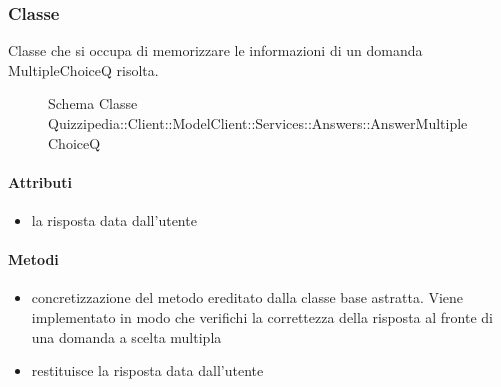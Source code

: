 \subsubsection{Classe }
Classe che si occupa di memorizzare le informazioni di un domanda MultipleChoiceQ risolta.
\begin{figure}[H]
\centering
\noindent{}
\caption[Schema Classe AnswerMultipleChoiceQ]{Schema Classe Quizzipedia::Client::ModelClient::Services::Answers::AnswerMultipleChoiceQ}
\end{figure}
\paragraph{Attributi}
\begin{itemize}
\item {}
\newline
la risposta data dall'utente
\end{itemize}
\paragraph{Metodi}
\begin{itemize}
\item {}
\newline
concretizzazione del metodo ereditato dalla classe base astratta. Viene implementato in modo che verifichi la correttezza della risposta al fronte di una domanda a scelta multipla
\newline
\item {}
\newline
restituisce la risposta data dall'utente
\newline
\end{itemize}
